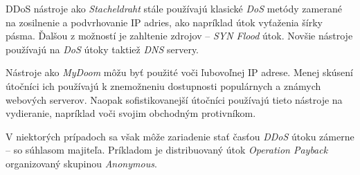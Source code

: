 \documentclass[
  digital, %
  table,   %
  lof,     %
  nolot,   %
  nocover
]{fithesis3}
\begin{document}
DDoS nástroje ako \textit{Stacheldraht} stále používajú klasické \textit{DoS} metódy zamerané na
zosilnenie a podvrhovanie IP adries, ako napríklad útok vyťaženia šírky pásma. Ďalšou z možností je
zahltenie zdrojov -- \textit{SYN Flood} útok. Novšie nástroje používajú na \textit{DoS} útoky taktiež
\textit{DNS} servery.

Nástroje ako \textit{MyDoom} môžu byť použité voči ľubovoľnej IP adrese. Menej skúsení útočníci ich
používajú k znemožneniu dostupnosti populárnych a známych webových serverov. Naopak sofistikovanejší
útočníci používajú tieto nástroje na vydieranie, napríklad voči svojim obchodným protivníkom.

V niektorých prípadoch sa však môže zariadenie stať časťou \textit{DDoS} útoku zámerne -- so súhlasom
majiteľa. Príkladom je distribuovaný útok \textit{Operation Payback} organizovaný skupinou
\textit{Anonymous}.






\end{document}
